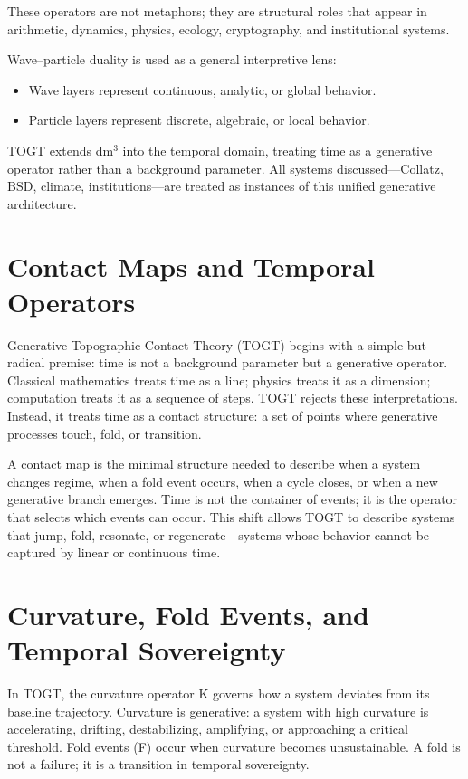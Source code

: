 \documentclass[14pt, twoside, openright]{book}
\theoremstyle{definition}
\theoremstyle{remark}
\begin{document}
These operators are not metaphors; they are structural roles that appear in
arithmetic, dynamics, physics, ecology, cryptography, and institutional systems.

Wave--particle duality is used as a general interpretive lens:

\begin{itemize}[leftmargin=2em]
  \item Wave layers represent continuous, analytic, or global behavior.
  \item Particle layers represent discrete, algebraic, or local behavior.
\end{itemize}

TOGT extends dm$^{3}$ into the temporal domain, treating time as a generative
operator rather than a background parameter. All systems discussed---Collatz,
BSD, climate, institutions---are treated as instances of this unified generative
architecture.

\section{Contact Maps and Temporal Operators}

Generative Topographic Contact Theory (TOGT) begins with a simple but radical
premise: time is not a background parameter but a generative operator. Classical
mathematics treats time as a line; physics treats it as a dimension; computation
treats it as a sequence of steps. TOGT rejects these interpretations. Instead,
it treats time as a contact structure: a set of points where generative processes
touch, fold, or transition.

A contact map is the minimal structure needed to describe when a system changes
regime, when a fold event occurs, when a cycle closes, or when a new generative
branch emerges. Time is not the container of events; it is the operator that
selects which events can occur. This shift allows TOGT to describe systems that
jump, fold, resonate, or regenerate---systems whose behavior cannot be captured
by linear or continuous time.

\section{Curvature, Fold Events, and Temporal Sovereignty}

In TOGT, the curvature operator K governs how a system deviates from its baseline
trajectory. Curvature is generative: a system with high curvature is accelerating,
drifting, destabilizing, amplifying, or approaching a critical threshold. Fold
events (F) occur when curvature becomes unsustainable. A fold is not a failure;
it is a transition in temporal sovereignty.
\end{document}
